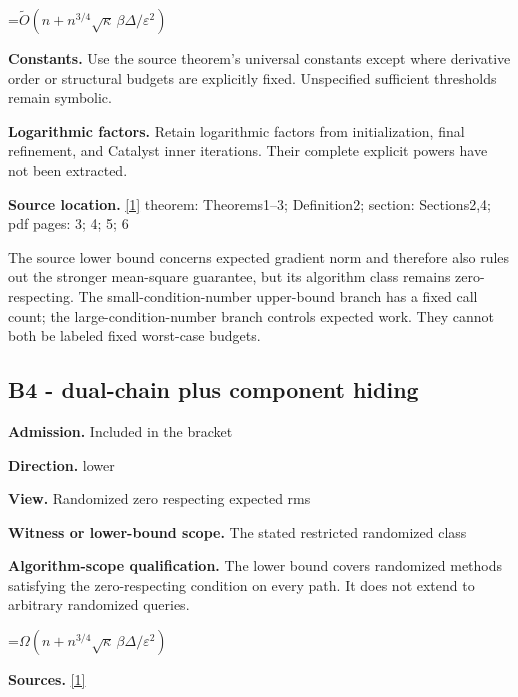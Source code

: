 \documentclass[10pt,a4paper]{article}
\newcommand{\AtlasMath}[1]{\par\begingroup\centering\setbox0=\hbox{$\displaystyle #1$}\ifdim\wd0>1.4\linewidth\typeout{ATLAS WIDE FORMULA: \the\wd0}\fi\ifdim\wd0>\linewidth\resizebox{\linewidth}{!}{\box0}\else\box0\fi\par\endgroup}
\begin{document}
\AtlasMath{\widetilde O(n+n^{3/4}\sqrt\kappa\,\beta\Delta/\varepsilon^2)}


\textbf{Constants.} Use the source theorem’s universal constants except where derivative order or structural budgets are explicitly fixed. Unspecified sufficient thresholds remain symbolic.



\textbf{Logarithmic factors.} Retain logarithmic factors from initialization, final refinement, and Catalyst inner iterations. Their complete explicit powers have not been extracted.



\textbf{Source location.} \href{https://arxiv.org/pdf/2610.04944v1}{[1]} theorem: Theorems1--3; Definition2; section: Sections2,4; pdf pages: 3; 4; 5; 6



The source lower bound concerns expected gradient norm and therefore also rules out the stronger mean-square guarantee, but its algorithm class remains zero-respecting. The small-condition-number upper-bound branch has a fixed call count; the large-condition-number branch controls expected work. They cannot both be labeled fixed worst-case budgets.



\subsection{B4 - dual-chain plus component hiding}


\textbf{Admission.} Included in the bracket



\textbf{Direction.} lower



\textbf{View.} Randomized zero respecting expected rms



\textbf{Witness or lower-bound scope.} The stated restricted randomized class



\textbf{Algorithm-scope qualification.} The lower bound covers randomized methods satisfying the zero-respecting condition on every path. It does not extend to arbitrary randomized queries.



\AtlasMath{\Omega(n+n^{3/4}\sqrt\kappa\,\beta\Delta/\varepsilon^2)}


\textbf{Sources.} \href{https://arxiv.org/pdf/2610.04944v1}{[1]}
\end{document}
